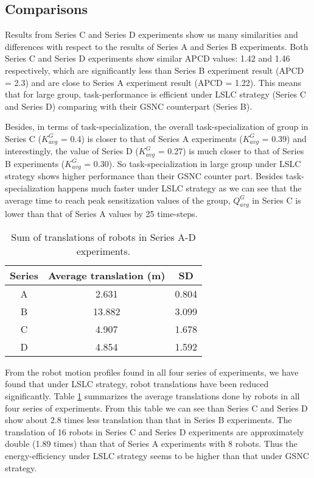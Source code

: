 \documentclass{intech}
\begin{document}
\subsection{Comparisons}
Results from Series C and Series D experiments show us many similarities and differences with respect to the results of Series A and Series B experiments. Both Series C and Series D experiments show similar APCD values: 1.42 and 1.46 respectively, which are significantly less than Series B experiment result (APCD = 2.3) and are close to Series A experiment result (APCD = 1.22). This means that for large group, task-performance  is efficient under LSLC strategy (Series C and Series D) comparing with their GSNC counterpart (Series B).

Besides, in terms of task-specialization, the overall task-specialization of group in Series C ($K^G_{avg}$ = 0.4) is  closer to that of Series A experiments ($K^G_{avg}$ = 0.39) and interestingly, the value of  Series D ($K^G_{avg}$ = 0.27) is  much closer to that of Series B experiments ($K^G_{avg}$ = 0.30). So task-specialization in large group under LSLC strategy shows higher performance than their GSNC counter part. Besides task-specialization happens much faster under LSLC strategy as we can see that the average time to reach peak sensitization values  of the group,  $Q^G_{avg}$ in Series C is lower than that of Series A values by 25 time-steps.
\begin{table}
\begin{center}
\caption{Sum of translations of robots in Series A-D experiments.}
\begin{tabular}{|c|c|c|}
\hline \textbf{Series} & \textbf{Average translation (m)} & \textbf{SD} \\ 
\hline A & 2.631 & 0.804\\ 
\hline B & 13.882 & 3.099\\
\hline C & 4.907 & 1.678\\
\hline D & 4.854 & 1.592\\
\hline
\end{tabular}
\label{table:motion-cmp} 
\end{center}
\end{table}
From the robot motion profiles found in all four series of experiments, we have found that under LSLC strategy, robot translations have been reduced significantly. Table \ref{table:motion-cmp} summarizes the average translations done by robots in all four series of experiments. From this table we can see than Series C and Series D show about 2.8 times less translation than that in Series B experiments. The translation of 16 robots in Series C and Series D experiments are approximately double (1.89 times) than that of Series A experiments with 8 robots.  Thus the energy-efficiency under LSLC strategy seems to be higher  than that under GSNC strategy.
\end{document}
